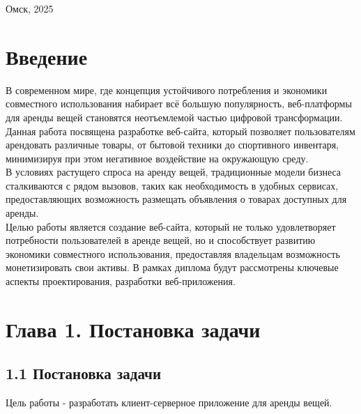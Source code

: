 \documentclass[14pt]{extarticle}
\begin{document}
\begin{titlepage}
\begin{center}
        \bigskip
        \bigskip
        \bigskip
        \bigskip
        \bigskip
        \bigskip

        Омск, 2025
    \end{center}
\end{titlepage}

\newpage

\setcounter{page}{2}
\tableofcontents
\newpage


\section{Введение}

\bigskip

В современном мире, где концепция устойчивого потребления и экономики
совместного использования набирает всё большую популярность,
веб-платформы для аренды вещей становятся неотъемлемой частью
цифровой трансформации.
Данная работа посвящена разработке веб-сайта,
который позволяет пользователям арендовать различные товары,
от бытовой техники до спортивного инвентаря,
минимизируя при этом негативное воздействие на окружающую среду.\\

В условиях растущего спроса на аренду вещей,
традиционные модели бизнеса сталкиваются с рядом вызовов,
таких как необходимость в удобных сервисах,
предоставляющих возможность размещать объявления о товарах доступных для аренды.\\

Целью работы является создание веб-сайта, который не только
удовлетворяет потребности пользователей в аренде вещей,
но и способствует развитию экономики совместного использования,
предоставляя владельцам возможность монетизировать свои активы.
В рамках диплома будут рассмотрены ключевые аспекты проектирования,
разработки веб-приложения.\\

\newpage


\section{Глава 1. Постановка задачи}

\subsection{1.1 Постановка задачи}

\bigskip

Цель работы - разработать клиент-серверное приложение для аренды вещей.\\
\end{document}
